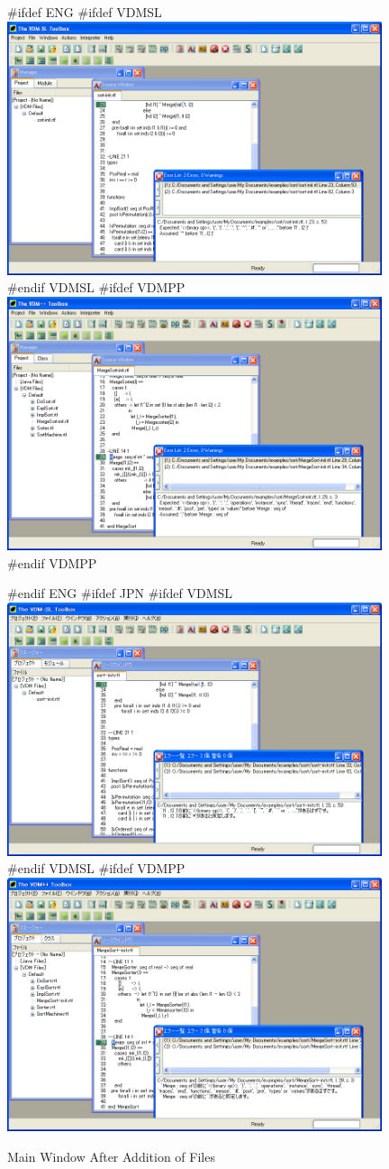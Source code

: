 \documentclass[\pformat,12pt]{article}
\begin{document}
\begin{figure}[tbh]
\begin{center}
#ifdef ENG
#ifdef VDMSL
\includegraphics[width=11cm]{addedFiles-slENG.png}
#endif VDMSL
#ifdef VDMPP
\includegraphics[width=11cm]{addedFiles-ppENG.png}
#endif VDMPP
\caption{Main Window After Addition of Files}
#endif ENG
#ifdef JPN
#ifdef VDMSL
\includegraphics[width=11cm]{addedFiles-sl.png}
#endif VDMSL
#ifdef VDMPP
\includegraphics[width=11cm]{addedFiles-pp.png}

\end{center}
\end{figure}
\end{document}
